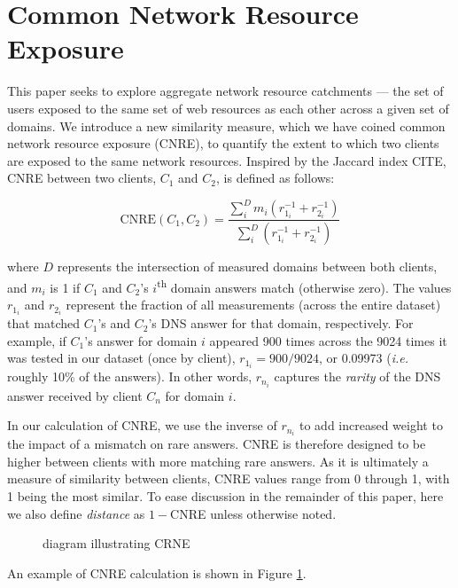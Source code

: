 \section{Common Network Resource Exposure} \label{sect:crne}

This paper seeks to explore aggregate network resource catchments --- the set of
users exposed to the same set of web resources as each other across a given set
of domains. We introduce a new similarity measure, which we have coined common
network resource exposure (CNRE), to quantify the extent to which two clients
are exposed to the same network resources. Inspired by the Jaccard index CITE,
CNRE between two clients, $C_1$ and $C_2$, is defined as follows:

\[ \textrm{CNRE}(C_1, C_2) = \frac{ \sum_{i}^D  m_{i} (r_{1_i}^{-1}+r_{2_i}^{-1})}{ \sum_{i}^D (r_{1_i}^{-1}+r_{2_i}^{-1})} \]

where $D$ represents the intersection of measured domains between both clients, 
and $m_{i}$ is 1 if $C_{1}$ and $C_{2}$'s
$i$\textsuperscript{th} domain answers match (otherwise zero). The values
$r_{1_i}$ and $r_{2_i}$ represent the fraction of all measurements (across the
entire dataset) that matched $C_1$'s and $C_2$'s DNS answer for that domain,
respectively. For example, if $C_1$'s answer for domain $i$ appeared 900 times
across the 9024 times it was tested in our dataset (once by client), 
\(r_{1_i} =  900 / 9024\), or 0.09973 (\emph{i.e.} roughly 10\% of the answers). 
In other words, $r_{n_i}$ captures the
\emph{rarity} of the DNS answer received by client $C_n$ for domain $i$.

In our calculation of CNRE, we use the inverse of $r_{n_i}$ to add increased
weight to the impact of a mismatch on rare answers. CNRE is therefore designed
to be higher between clients with more matching rare answers. As it is
ultimately a measure of similarity between clients, CNRE values range from 0
through 1, with 1 being the most similar. To ease discussion in the remainder of
this paper, here we also define \emph{distance} as \(1 - \)CNRE unless otherwise
noted.

\begin{figure}
    \caption{diagram illustrating CRNE}
    \label{fig:cnre}
\end{figure}

An example of CNRE calculation is shown in Figure \ref{fig:cnre}.

